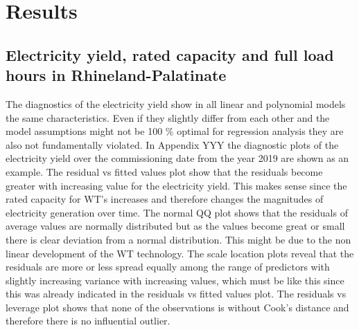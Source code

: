 \documentclass[a4paper,11pt]{article}
\begin{document}
\hypertarget{results}{%
\section{Results}\label{results}}

\hypertarget{electricity-yield-rated-capacity-and-full-load-hours-in-rhineland-palatinate}{%
\subsection{Electricity yield, rated capacity and full load hours in Rhineland-Palatinate}\label{electricity-yield-rated-capacity-and-full-load-hours-in-rhineland-palatinate}}

The diagnostics of the electricity yield show in all linear and polynomial models the same characteristics. Even if they slightly differ from each other and the model assumptions might not be 100 \% optimal for regression analysis they are also not fundamentally violated. In Appendix YYY the diagnostic plots of the electricity yield over the commissioning date from the year 2019 are shown as an example. The residual vs fitted values plot show that the residuals become greater with increasing value for the electricity yield. This makes sense since the rated capacity for WT's increases and therefore changes the magnitudes of electricity generation over time. The normal QQ plot shows that the residuals of average values are normally distributed but as the values become great or small there is clear deviation from a normal distribution. This might be due to the non linear development of the WT technology. The scale location plots reveal that the residuals are more or less spread equally among the range of predictors with slightly increasing variance with increasing values, which must be like this since this was already indicated in the residuals vs fitted values plot. The residuals vs leverage plot shows that none of the observations is without Cook's distance and therefore there is no influential outlier.
\end{document}
